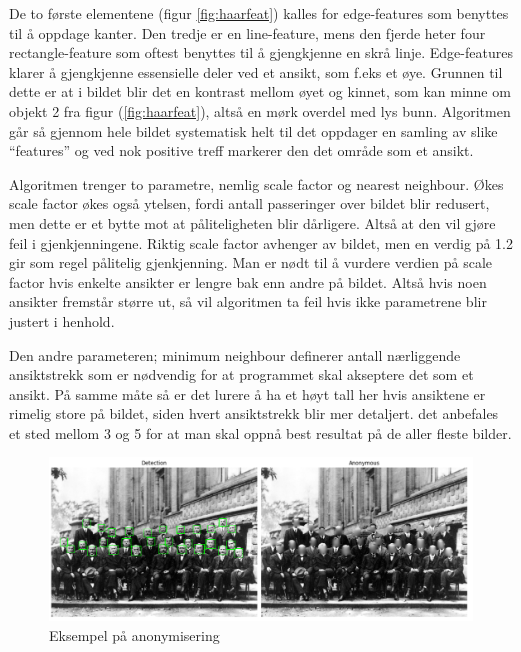 De to første elementene (figur \ref{fig:haarfeat}) kalles for edge-features som benyttes til å oppdage kanter. Den tredje er en line-feature, mens den fjerde heter four rectangle-feature som oftest benyttes til å gjengkjenne en skrå linje. Edge-features klarer å gjengkjenne essensielle deler ved et ansikt, som f.eks et øye. Grunnen til dette er at i bildet blir det en kontrast mellom øyet og kinnet, som kan minne om objekt 2 fra figur (\ref{fig:haarfeat}), altså en mørk overdel med lys bunn. Algoritmen går så gjennom hele bildet systematisk helt til det oppdager en samling av slike ``features'' og ved nok positive treff markerer den det område som et ansikt.

Algoritmen trenger to parametre, nemlig scale factor og nearest neighbour. Økes scale factor økes også ytelsen, fordi antall passeringer over bildet blir redusert, men dette er et bytte mot at påliteligheten blir dårligere. Altså at den vil gjøre feil i gjenkjenningene. Riktig scale factor avhenger av bildet, men en verdig på 1.2 gir som regel pålitelig gjenkjenning. Man er nødt til å vurdere verdien på scale factor hvis enkelte ansikter er lengre bak enn andre på bildet. Altså hvis noen ansikter fremstår større ut, så vil algoritmen ta feil hvis ikke parametrene blir justert i henhold.

Den andre parameteren; minimum neighbour definerer antall nærliggende ansiktstrekk som er nødvendig for at programmet skal akseptere det som et ansikt. På samme måte så er det lurere å ha et høyt tall her hvis ansiktene er rimelig store på bildet, siden hvert ansiktstrekk blir mer detaljert. det anbefales et sted mellom 3 og 5 for at man skal oppnå best resultat på de aller fleste bilder.
\begin{figure}[H]
\begin{center}
 \includegraphics[width=1\columnwidth]{bilder/Anonymisering/faceDetectionExample.png}
     \caption{Eksempel på anonymisering \label{fig:family}} 
\end{center}
\end{figure}

